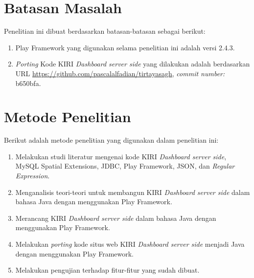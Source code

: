 \section{Batasan Masalah}
\label{sec:batasan_masalah}
Penelitian ini dibuat berdasarkan batasan-batasan sebagai berikut:
	\begin{enumerate}
		\item Play Framework yang digunakan selama penelitian ini adalah versi 2.4.3.
		\item \textit{Porting} Kode KIRI \textit{Dashboard server side} yang dilakukan adalah berdasarkan URL \url{https://github.com/pascalalfadian/tirtayasagh}, \textit{commit number:} b650bfa.
	\end{enumerate}
	
\section{Metode Penelitian}
\label{sec:metode_penelitian}
Berikut adalah metode penelitian yang digunakan dalam penelitian ini:
	\begin{enumerate}
		\item Melakukan studi literatur mengenai kode KIRI \textit{Dashboard server side}, MySQL Spatial Extensions, JDBC, Play Framework, JSON, dan \textit{Regular Expression}.
		\item Menganalisis teori-teori untuk membangun KIRI \textit{Dashboard server side} dalam bahasa Java dengan menggunakan Play Framework.
		\item Merancang KIRI \textit{Dashboard server side} dalam bahasa Java dengan menggunakan Play Framework.
		\item Melakukan \textit{porting} kode situs web KIRI \textit{Dashboard server side} menjadi Java dengan menggunakan Play Framework.
		\item Melakukan pengujian terhadap fitur-fitur yang sudah dibuat.
	\end{enumerate}

